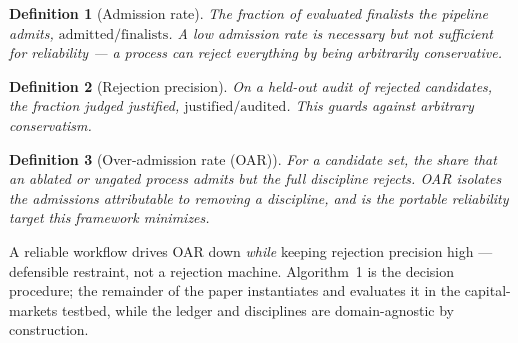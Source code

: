 \documentclass[11pt]{article}
\newtheorem{definition}{Definition}
\begin{document}
\begin{definition}[Admission rate]
The fraction of evaluated finalists the pipeline admits, $\text{admitted}/\text{finalists}$. A low
admission rate is necessary but not sufficient for reliability --- a process can reject everything by
being arbitrarily conservative.
\end{definition}

\begin{definition}[Rejection precision]
On a held-out audit of rejected candidates, the fraction judged \emph{justified},
$\text{justified}/\text{audited}$. This guards against arbitrary conservatism.
\end{definition}

\begin{definition}[Over-admission rate (OAR)]
For a candidate set, the share that an ablated or ungated process \emph{admits} but the full
discipline \emph{rejects}. OAR isolates the admissions attributable to removing a discipline, and is
the portable reliability target this framework minimizes.
\end{definition}

A reliable workflow drives OAR down \emph{while} keeping rejection precision high --- defensible
restraint, not a rejection machine. Algorithm~1 is the decision procedure; the remainder of the paper
instantiates and evaluates it in the capital-markets testbed, while the ledger and disciplines are
domain-agnostic by construction.

\begin{center}
\end{center}
\end{document}
